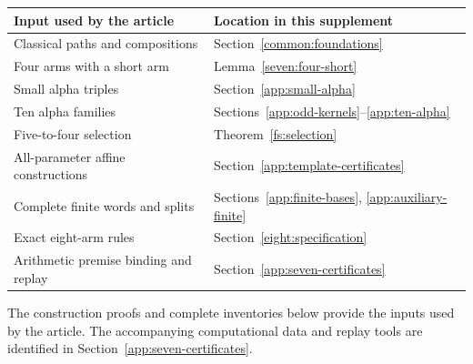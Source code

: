 \begin{center}\small
\begin{tabular}{@{}p{}p{}@{}}
\toprule
Input used by the article & Location in this supplement\\
\midrule
Classical paths and compositions & Section~\ref{common:foundations}\\
Four arms with a short arm & Lemma~\ref{seven:four-short}\\
Small alpha triples & Section~\ref{app:small-alpha}\\
Ten alpha families & Sections~\ref{app:odd-kernels}--\ref{app:ten-alpha}\\
Five-to-four selection & Theorem~\ref{fs:selection}\\
All-parameter affine constructions & Section~\ref{app:template-certificates}\\
Complete finite words and splits & Sections~\ref{app:finite-bases}, \ref{app:auxiliary-finite}\\
Exact eight-arm rules & Section~\ref{eight:specification}\\
Arithmetic premise binding and replay & Section~\ref{app:seven-certificates}\\
\bottomrule
\end{tabular}
\end{center}
The construction proofs and complete inventories below provide the
inputs used by the article. The accompanying computational data and
replay tools are identified in Section~\ref{app:seven-certificates}.

\tableofcontents
\clearpage

















\authoraddresses

